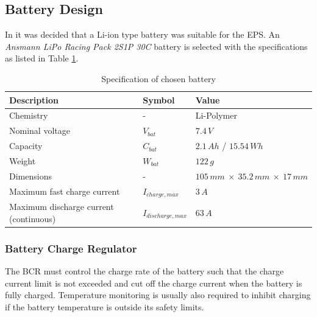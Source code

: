 \subsection{Battery Design}
In \cite{PDR} it was decided that a Li-ion type battery was suitable for the \ac{EPS}. An \textit{Ansmann \ac{LiPo} Racing Pack 2S1P 30C} battery is selected with the specifications as listed in Table \ref{tab:proposed_battery}.
%
\begin{table}[H]
\centering
\caption{Specification of chosen battery}
\label{tab:proposed_battery}
\begin{tabular}{p{}p{}p{}}
\hline
\textbf{Description} & \textbf{Symbol} & \textbf{Value}\\
\hline 
Chemistry & - & Li-Polymer\\
Nominal voltage & $V_{bat}$ & $7.4\,V$\\
Capacity & $C_{bat}$ & $2.1\,Ah$ / $15.54\,Wh$\\
Weight & $W_{bat}$ & $122\,g$\\
Dimensions & - & $105\,mm\:\times\:35.2\,mm\:\times\:17\,mm$\\
Maximum fast charge current & $I_{charge,max}$ & $3\,A$\\
Maximum discharge current (continuous) & $I_{discharge,max}$ & $63\,A$\\
\hline
\end{tabular}
\end{table}
%
%
\subsubsection{Battery Charge Regulator}
\label{subsec:BCR}
%
The \ac{BCR} must control the charge rate of the battery such that the charge current limit is not exceeded and cut off the charge current when the battery is fully charged. Temperature monitoring is usually also required to inhibit charging if the battery temperature is outside its safety limits. 


